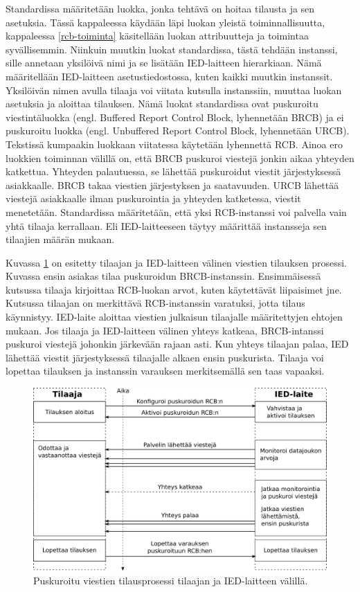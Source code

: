 Standardissa määritetään luokka, jonka tehtävä on hoitaa tilausta ja sen asetuksia. Tässä kappaleessa käydään läpi luokan yleistä toiminnallisuutta, kappaleessa \ref{rcb-toiminta} käsitellään luokan attribuutteja ja toimintaa syvällisemmin. Niinkuin muutkin luokat standardissa, tästä tehdään instanssi, sille annetaan yksilöivä nimi ja se lisätään IED-laitteen hierarkiaan. Nämä määritellään IED-laitteen asetustiedostossa, kuten kaikki muutkin instanssit. Yksilöivän nimen avulla tilaaja voi viitata kutsulla instanssiin, muuttaa luokan asetuksia ja aloittaa tilauksen. Nämä luokat standardissa ovat puskuroitu viestintäluokka (engl. Buffered Report Control Block, lyhennetään BRCB) ja ei puskuroitu luokka (engl. Unbuffered Report Control Block, lyhennetään URCB). Tekstissä kumpaakin luokkaan viitatessa käytetään lyhennettä RCB. Ainoa ero luokkien toiminnan välillä on, että BRCB puskuroi viestejä jonkin aikaa yhteyden katkettua. Yhteyden palautuessa, se lähettää puskuroidut viestit järjestyksessä asiakkaalle. BRCB takaa viestien järjestyksen ja saatavuuden. URCB lähettää viestejä asiakkaalle ilman puskurointia ja yhteyden katketessa, viestit menetetään. Standardissa määritetään, että yksi RCB-instanssi voi palvella vain yhtä tilaaja kerrallaan. Eli IED-laitteeseen täytyy määrittää instansseja sen tilaajien määrän mukaan.

Kuvassa \ref{fig:iec61850-brcb-communication} on esitetty tilaajan ja IED-laitteen välinen viestien tilauksen prosessi. Kuvassa ensin asiakas tilaa puskuroidun BRCB-instanssin. Ensimmäisessä kutsussa tilaaja kirjoittaa RCB-luokan arvot, kuten käytettävät liipaisimet jne. Kutsussa tilaajan on merkittävä RCB-instanssin varatuksi, jotta tilaus käynnistyy. IED-laite aloittaa viestien julkaisun tilaajalle määritettyjen ehtojen mukaan. Jos tilaaja ja IED-laitteen välinen yhteys katkeaa, BRCB-intanssi puskuroi viestejä johonkin järkevään rajaan asti. Kun yhteys tilaajan palaa, IED lähettää viestit järjestyksessä tilaajalle alkaen ensin puskurista. Tilaaja voi lopettaa tilauksen ja instanssin varauksen merkitsemällä sen taas vapaaksi.

\begin{figure}[ht!]
	\includegraphics[width=1\textwidth]{pictures/iec61850-brcb-communication.png}
	\caption{Puskuroitu viestien tilausprosessi tilaajan ja IED-laitteen välillä.}
	\label{fig:iec61850-brcb-communication}
\end{figure}

